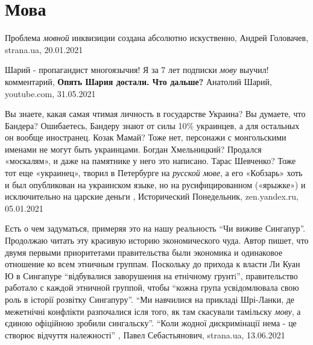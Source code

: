  
 
 
 
 
\chapter{Мова}

Проблема \emph{мовной} инквизиции создана абсолютно искуственно, Андрей
Головачев, strana.ua, 20.01.2021

Шарий - пропагандист многоязычия! Я за 7 лет подписки \emph{мову} выучил!
комментарий, \textbf{Опять Шария достали. Что дальше?} Анатолий Шарий,
youtube.com, 31.05.2021

Вы знаете, какая самая чтимая личность в государстве Украина? Вы думаете, что
Бандера? Ошибаетесь, Бандеру знают от силы 10\% украинцев, а для остальных он
вообще иностранец. Козак Мамай? Тоже нет, персонажи с монгольскими именами не
могут быть украинцами. Богдан Хмельницкий? Продался «москалям», и даже на
памятнике у него это написано.  Тарас Шевченко? Тоже тот еще «украинец», творил
в Петербурге на \emph{русской мове}, а его «Кобзарь» хоть и был опубликован на
украинском языке, но на русифицированном («ярыжке») и исключительно на царские
деньги
,
Исторический Понедельник, zen.yandex.ru, 05.01.2021 

Есть о чем задуматься, примеряя это на нашу реальность \enquote{Чи виживе
Сингапур}. Продолжаю читать эту красивую историю экономического чуда. Автор
пишет, что двумя первыми приоритетами правительства были экономика и одинаковое
отношение ко всем этничным группам. Поскольку до прихода к власти Ли Куан Ю в
Сингапуре \enquote{відбувалися заворушення на етнічному грунтi}, правительство
работало с каждой этничной группой, чтобы \enquote{кожна група усвідомлювала
свою роль в історії розвітку Сингапуру}. \enquote{Ми навчилися на прикладі
Шрі-Ланки, де межетнічні конфлікти разпочалися ісля того, як там скасували
тамільску \emph{мову}, а єдиною офіційною зробили сингальску}. \enquote{Коли
жодної дискримінації нема - це створює відчуття належності}
, 
Павел Себастьянович, strana.ua, 13.06.2021

